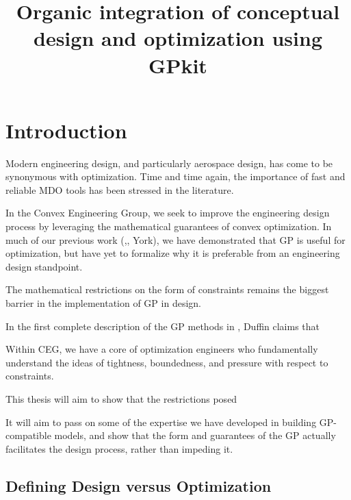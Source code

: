 \documentclass{aiaa-pretty}
\begin{document}
\title{Organic integration of conceptual design and optimization using GPkit}
\maketitle

\section{\bf Introduction}

Modern engineering design, and particularly aerospace design, has come to be synonymous with optimization. Time and time again, the importance of fast and reliable MDO tools has been stressed in the literature.  
	
In the Convex Engineering Group, we seek to improve the engineering design process by leveraging the mathematical guarantees of convex optimization. In much of our previous work (\cite{gp_ac_design},\cite{SP_ac_design}, York), we have demonstrated that \gls{GP} is useful for optimization, but have yet to formalize why it is preferable from an engineering design standpoint. 
 
The mathematical restrictions on the form of constraints remains the biggest barrier in the implementation of GP in design.

In the first complete description of the \gls{GP} methods in \cite{duffingp}, Duffin claims that 

Within CEG, we have a core of optimization engineers who fundamentally understand the ideas of tightness, boundedness, and pressure with respect to constraints. 

This thesis will aim to show that the restrictions posed 

It will aim to pass on some of the expertise we have developed in building \gls{GP}-compatible models, and show that the form and guarantees of the GP actually facilitates the design process, rather than impeding it. 
	
\subsection{Defining Design versus Optimization}
\end{document}
